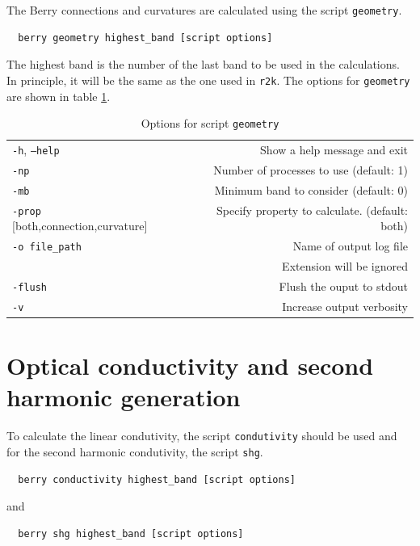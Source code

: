\documentclass[a4paper,12pt]{report}
\begin{document}
The Berry connections and curvatures are calculated using the script \texttt{geometry}.
\begin{verbatim}
  berry geometry highest_band [script options]
 \end{verbatim}


The highest band is the number of the last band to be used in the calculations.
In principle, it will be the same as the one used in \texttt{r2k}.
The options for \texttt{geometry} are shown in table \ref{tab:options_geometry}.

\begin{table}[ht]
 \centering
 \caption{Options for script \texttt{geometry}}\label{tab:options_geometry}
\begin{tabular}[]{lr}
  \hline
  \texttt{-h}, \texttt{--help}  &\hspace*{2cm} Show a help message and exit \\
  \texttt{-np}                  & Number of processes to use (default: 1) \\
  \texttt{-mb}                  & Minimum band to consider (default: 0) \\
  \texttt{-prop} [both,connection,curvature] &  Specify property to calculate. (default: both)\\
  \texttt{-o file\_path}        & Name of output log file\\
                                & Extension will be ignored\\
  \texttt{-flush}               & Flush the ouput to stdout \\
  \texttt{-v}                   & Increase output verbosity \\
  \hline
\end{tabular}
\end{table}



\section{Optical conductivity and second harmonic generation}

To calculate the linear condutivity, the script \texttt{condutivity} should be used
and for the second harmonic condutivity, the script \texttt{shg}.
\begin{verbatim}
  berry conductivity highest_band [script options]
 \end{verbatim}
 and
 \begin{verbatim}
  berry shg highest_band [script options]
 \end{verbatim}
\end{document}
